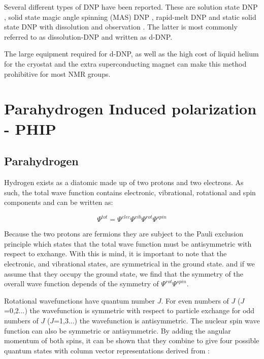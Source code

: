 Several different types of DNP have been reported. These are solution
state DNP \citep{RN158}, solid state magic angle spinning (MAS) DNP \citep{RN159}, rapid-melt DNP \citep{sharma2015rapid} and static solid state DNP with
dissolution and observation \citep{RN160}. The latter is most commonly referred to as dissolution-DNP and written as d-DNP.

The large equipment required for d-DNP, as well as the high cost of liquid helium for the cryostat and
the extra superconducting magnet can make this method prohibitive for most NMR groups.

 \section{Parahydrogen Induced polarization - PHIP}

 \subsection{Parahydrogen}

 Hydrogen exists as a diatomic made up of two protons and two electrons. As such, the total
 wave function contains electronic, vibrational, rotational and spin components and can be
 written as:

 \begin{equation}
  \Psi^{tot} =\Psi^{elec}\Psi^{vib}\Psi^{rot}\Psi^{spin}
 \end{equation}

 Because the two protons are fermions they are subject to the Pauli exclusion principle
 which states that the total wave function must be antisymmetric with respect to exchange. With
 this is mind, it is important to note that the electronic, and vibrational states, are symmetrical
 in the ground state.  and if we assume that they occupy the ground state, we find that the symmetry
 of the overall wave function depends of the symmetry of $\Psi^{rot}$$\Psi^{spin}$.

 Rotational wavefunctions have quantum number $J$. For even numbers of $J$ ($J$=0,2...) the wavefunction
 is symmetric with respect to particle exchange for odd numbers of $J$ ($J$=1,3...) the wavefunction is
 antisymmetric. The nuclear spin wave function can also be symmetric or antisymmetric. By adding the
 angular momentum of both spins, it can be shown that they combine to give four possible quantum states
 with column vector representations derived from :

